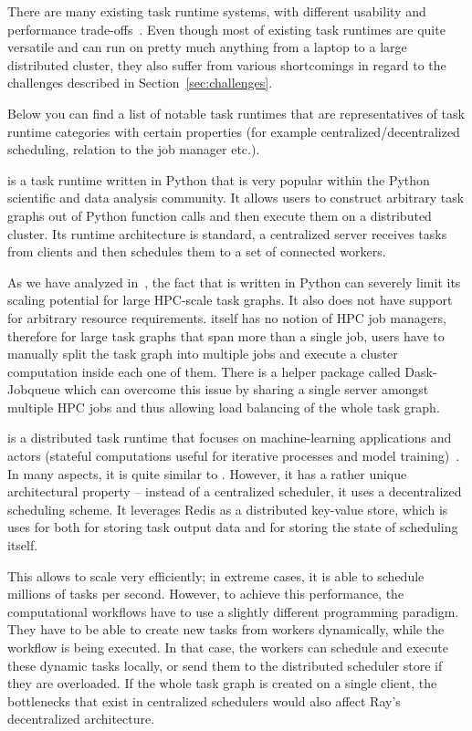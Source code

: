 There are many existing task runtime systems, with different usability and performance
trade-offs~\cite{dask, nextflow, snakemake, pycompss, parsl, ray}. Even though most of existing
task runtimes are quite versatile and can run on pretty much anything from a laptop to a large
distributed cluster, they also suffer from various shortcomings in regard to the challenges
described in Section~\ref{sec:challenges}.


Below you can find a list of notable task runtimes that are representatives of task runtime
categories with certain properties (for example centralized/decentralized scheduling,
relation to the job manager etc.).

\dask{} is a task runtime written in Python that is very popular within the Python
scientific and data analysis community\cite{dask,dask-user-survey}. It allows users to construct
arbitrary task graphs out of Python function calls and then execute them on a distributed cluster.
Its runtime architecture is standard, a centralized server receives tasks from clients and
then schedules them to a set of connected workers.

As we have analyzed in~\cite{rsds}, the fact that \dask{} is written in Python can severely limit
its scaling potential for large HPC-scale task graphs. It also does not have support for arbitrary
resource requirements. \dask{} itself has no notion of HPC job managers, therefore for large task
graphs that span more than a single job, users have to manually split the task graph into
multiple jobs and execute a \dask{} cluster computation inside each one of them. There is a helper
package called Dask-Jobqueue which can overcome this
issue by sharing a single server amongst multiple HPC jobs and thus allowing load balancing of
the whole task graph.

\ray{} is a distributed task runtime that focuses on machine-learning applications and
actors (stateful computations useful for iterative processes and model training)~\cite{ray}.
In many aspects, it is quite similar to \dask{}. However, it has a rather unique architectural
property -- instead of a centralized scheduler, it uses a decentralized scheduling scheme. It
leverages Redis as a distributed key-value store, which is uses for both for storing task
output data and for storing the state of scheduling itself.

This allows \ray{} to scale very efficiently; in extreme cases, it is able to schedule millions
of tasks per second. However, to achieve this performance, the computational workflows have to use
a slightly different programming paradigm. They have to be able to create new tasks from workers
dynamically, while the workflow is being executed. In that case, the workers can schedule and
execute these dynamic tasks locally, or send them to the distributed scheduler store if they are
overloaded. If the whole task graph is created on a single client, the bottlenecks that exist in
centralized schedulers would also affect Ray's decentralized architecture.

